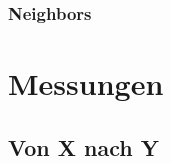 \subsubsection{Neighbors}



\section{Messungen}
\label{appendix:measures}
\subsection{Von X nach Y}





%  
% 

